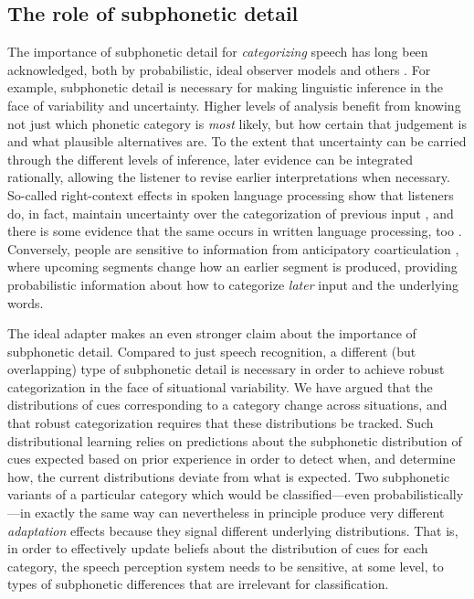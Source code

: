 \subsection{The role of subphonetic detail}
\label{sec:impl-role-subph}

\label{r3-subphonetic-classification}
The importance of subphonetic detail for \emph{categorizing} speech has long been acknowledged, both by probabilistic, ideal observer models \autocite{Clayards2008,Feldman2009a,Norris2008,Sonderegger2010} and others \autocite{McClelland1986,Norris1994,Norris2000}.  For example, subphonetic detail is necessary for making linguistic inference in the face of variability and uncertainty.  Higher levels of analysis benefit from knowing not just which phonetic category is \emph{most} likely, but how certain that judgement is and what plausible alternatives are.  To the extent that uncertainty can be carried through the different levels of inference, later evidence can be integrated rationally, allowing the listener to revise earlier interpretations when necessary.
So-called right-context effects in spoken language processing show that listeners do, in fact, maintain uncertainty over the categorization of previous input \autocite{Bard1988,Connine1991,Dahan2010,Grosjean1985}, and there is some evidence that the same occurs in written language processing, too \autocite{Levy2009}.  Conversely, people are sensitive to information from anticipatory coarticulation \autocite{Dahan2001a,Marslen-Wilson1994a,McQueen1999,Whalen1984}, where upcoming segments change how an earlier segment is produced, providing probabilistic information about how to categorize \emph{later} input and the underlying words.  

\label{r3-subphon-beyond-class}
The ideal adapter makes an even stronger claim about the importance of subphonetic detail.  Compared to just speech recognition, a different (but overlapping) type of subphonetic detail is necessary in order to achieve robust categorization in the face of situational variability.  We have argued that the distributions of cues corresponding to a category change across situations, and that robust categorization requires that these distributions be tracked.  Such distributional learning relies on predictions about the subphonetic distribution of cues expected based on prior experience in order to detect when, and determine how, the current distributions deviate from what is expected.
Two subphonetic variants of a particular category which would be classified---even probabilistically---in exactly the same way can nevertheless in principle produce very different \emph{adaptation} effects because they signal different underlying distributions.  That is, in order to effectively update beliefs about the distribution of cues for each category, the speech perception system needs to be sensitive, at some level, to types of subphonetic differences that are irrelevant for classification.


